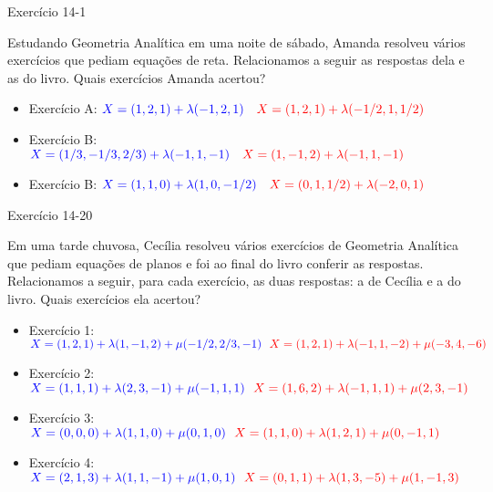 \begin{frame}{Exercício 14-1}
    \begin{minipage}{\textwidth}
        Estudando Geometria Analítica em uma noite de sábado, Amanda resolveu
        vários exercícios que pediam equações de reta. Relacionamos a seguir as
        respostas dela e as do livro. Quais exercícios Amanda acertou?
    \end{minipage}
    \begin{itemize}
        \item Exercício A: \(\color{blue} X=(1,2,1)+\lambda (-1,2,1) \quad \color{red} X=(1,2,1) + \lambda (-1/2,1,1/2)\)
        \item Exercício B: \(\color{blue} X=(1/3,-1/3,2/3)+\lambda (-1,1,-1) \quad \color{red} X=(1,-1,2) + \lambda (-1,1,-1)\)
        \item Exercício B: \(\color{blue} X=(1,1,0)+\lambda (1,0,-1/2) \quad \color{red} X=(0,1,1/2) + \lambda (-2,0,1)\)
    \end{itemize}
\end{frame}

\begin{frame}{Exercício 14-20}
    \begin{minipage}{\textwidth}
        Em uma tarde chuvosa, Cecília resolveu vários exercícios de Geometria
        Analítica que pediam equações de planos e foi ao final do livro conferir
        as respostas. Relacionamos a seguir, para cada exercício, as duas respostas:
        a de Cecília e a do livro. Quais exercícios ela acertou?
    \end{minipage}
    \begin{itemize}
        \item Exercício 1: \\ \(
            \color{blue} X=(1,2,1) + \lambda (1,-1,2) + \mu (-1/2,2/3,-1) ~~ 
            \color{red} X=(1,2,1)+\lambda (-1,1,-2)+\mu(-3,4,-6)
            \)
        \item Exercício 2: \\ \(
            \color{blue} X=(1,1,1) + \lambda (2,3,-1) + \mu (-1,1,1) ~~
            \color{red} X=(1,6,2) + \lambda (-1,1,1) +\mu (2,3,-1)
            \)
        \item Exercício 3: \\ \(
            \color{blue} X=(0,0,0)+\lambda (1,1,0) +\mu(0,1,0) ~~
            \color{red} X=(1,1,0) + \lambda (1,2,1) +\mu (0,-1,1)
            \)
        \item Exercício 4: \\ \(
            \color{blue} X=(2,1,3)+\lambda (1,1,-1) + \mu (1,0,1) ~~
            \color{red} X=(0,1,1)+\lambda(1,3,-5)+\mu(1,-1,3)
            \)
    \end{itemize}
\end{frame}


